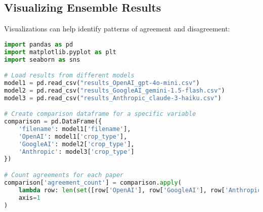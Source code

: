 \subsection{Visualizing Ensemble Results}

Visualizations can help identify patterns of agreement and disagreement:

\begin{commandbox}
\begin{lstlisting}[language=Python]
import pandas as pd
import matplotlib.pyplot as plt
import seaborn as sns

# Load results from different models
model1 = pd.read_csv("results_OpenAI_gpt-4o-mini.csv")
model2 = pd.read_csv("results_GoogleAI_gemini-1.5-flash.csv")
model3 = pd.read_csv("results_Anthropic_claude-3-haiku.csv")

# Create comparison dataframe for a specific variable
comparison = pd.DataFrame({
    'filename': model1['filename'],
    'OpenAI': model1['crop_type'],
    'GoogleAI': model2['crop_type'],
    'Anthropic': model3['crop_type']
})

# Count agreements for each paper
comparison['agreement_count'] = comparison.apply(
    lambda row: len(set([row['OpenAI'], row['GoogleAI'], row['Anthropic']])),
    axis=1
)
\end{lstlisting}
\end{commandbox}
